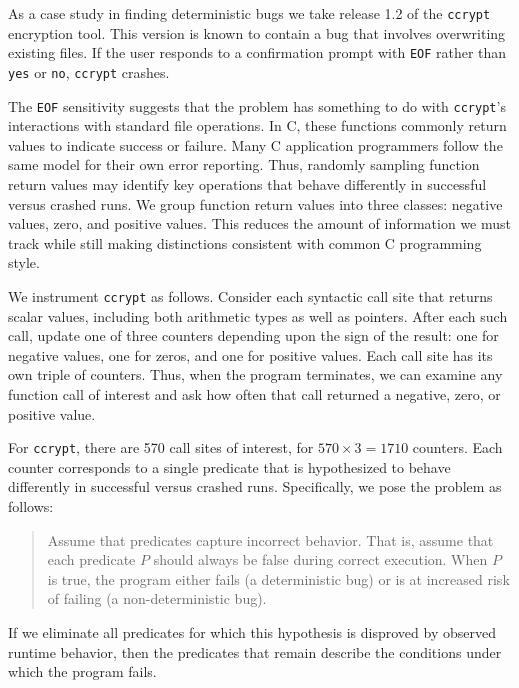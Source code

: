 As a case study in finding deterministic bugs we take release 1.2 of
the \texttt{ccrypt} encryption tool.  This version is known to contain
a bug that involves overwriting existing files.  If the user responds to
a confirmation prompt with
\texttt{EOF} rather than \texttt{yes} or \texttt{no}, \texttt{ccrypt}
crashes.

The \texttt{EOF} sensitivity suggests that the problem has something to do with
\texttt{ccrypt}'s interactions with standard file operations.
In C, these functions commonly return values to indicate
success or failure.  Many C application programmers follow the same
model for their own error reporting.  Thus, randomly sampling function
return values may identify key operations that behave differently in
successful versus crashed runs.  We group function return values into
three classes: negative values, zero, and positive values.  This
reduces the amount of information we must track while still making
distinctions consistent with common C programming style.

We instrument \texttt{ccrypt} as follows.
Consider each syntactic call site that returns
scalar values, including both arithmetic types as well as pointers.
After each such call, update one of three counters depending upon the
sign of the result: one for negative values, one for zeros, and one
for positive values.  Each call site has its own triple of counters.
Thus, when the program terminates, we can examine any function call of
interest and ask how often that call returned a negative, zero, or
positive value.  

For \texttt{ccrypt}, there are 570 call sites of interest, for $570 \times 3 =
1710$ counters.  Each counter corresponds to a single predicate that
is hypothesized to behave differently in successful versus crashed
runs.  Specifically, we pose the problem as follows:

\pagebreak[3]

\begin{quote}
  Assume that predicates capture incorrect behavior.  That is, assume
  that each predicate $P$ should always be false during correct
  execution.  When $P$ is true, the program either fails (a deterministic
bug) or is at
  increased risk of failing (a non-deterministic bug).
\end{quote}

If we eliminate all predicates for which this hypothesis is disproved
by observed runtime behavior, then the predicates that remain
describe the conditions under which the program fails.


